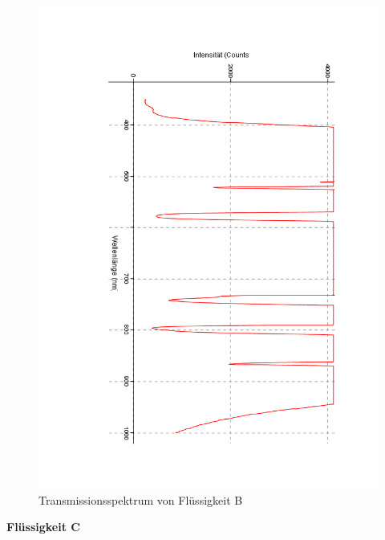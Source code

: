 \documentclass[12pt,a4paper]{article}
\begin{document}
\begin{figure}[H]
	\centering
	\includegraphics[scale=0.5,angle = 90,trim = 20mm 20mm 20mm 20mm]{./data/Spektro/Transmission_B_DO_4.pdf}
	\caption{Transmissionsspektrum von Flüssigkeit B}
	\label{fig:TransmissionB}
\end{figure}

\textbf{Flüssigkeit C}
\end{document}
